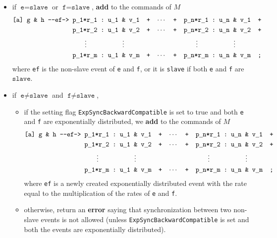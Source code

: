 \documentclass{article}
\newcommand{\arci}[1]{{-}{-}{#1}->}
\renewcommand{\_}{\underline{~}}
\newcommand{\code}[1]{\texttt{#1}}
\begin{document}
\begin{enumerate}
\begin{itemize}
		\item if $\code{e} = \code{slave}$ or  $\code{f} = \code{slave}$, \textbf{add} to the commands of $M$ 
		\begin{align*}
			\code{[a] g \&  h \arci{ef}} 
			  & \code{ p\_1*r\_1\ :\ u\_1 \& v\_1 ~+~ $\cdots$ ~+~ p\_n*r\_1\ :\ u\_n \& v\_1 ~+}\\
			  & \code{ p\_1*r\_2\ :\ u\_1 \& v\_2 ~+~ $\cdots$ ~+~ p\_n*r\_2\ :\ u\_n \& v\_2 ~+}\\
              & ~~~~~~~ \vdots ~~~~~~~~~~~~~~~~ \vdots ~~~~~~~~~~~~~~~~~~~~~~~~~~~~~~~~ \vdots ~~~~~~~~~~~~~~~~ \vdots \\
			  & \code{ p\_1*r\_m\ :\ u\_1 \& v\_m ~+~ $\cdots$ ~+~ p\_n*r\_m\ :\ u\_n \& v\_m ~;}\\
		\end{align*}
		where \code{ef} is the non-slave event of \code{e} and \code{f}, or it is \code{slave} if both \code{e} and \code{f} are $\code{slave}$.
		\item if $\code{e} \neq \code{slave}$ and $\code{f} \neq \code{slave}$, 
		\begin{itemize}
			\item if the setting flag \code{ExpSyncBackwardCompatible} is set to true and both \code{e} and \code{f} are exponentially distributed, we \textbf{add} to the commands of $M$ 
			\begin{align*}
			   \code{[a] g \&  h \arci{ef}} 
			     & \code{ p\_1*r\_1\ :\ u\_1 \& v\_1 ~+~ $\cdots$ ~+~ p\_n*r\_1\ :\ u\_n \& v\_1 ~+}\\
			     & \code{ p\_1*r\_2\ :\ u\_1 \& v\_2 ~+~ $\cdots$ ~+~ p\_n*r\_2\ :\ u\_n \& v\_2 ~+}\\
			     & ~~~~~~~ \vdots ~~~~~~~~~~~~~~~~ \vdots ~~~~~~~~~~~~~~~~~~~~~~~~~~~~~~~~ \vdots ~~~~~~~~~~~~~~~~ \vdots \\
			     & \code{ p\_1*r\_m\ :\ u\_1 \& v\_m ~+~ $\cdots$ ~+~ p\_n*r\_m\ :\ u\_n \& v\_m ~;}\\
			\end{align*}
			where \code{ef} is a newly created exponentially distributed event with the rate equal to the multiplication of the rates of \code{e} and \code{f}.
			
			
			\item otherwise, return an \textbf{error} saying that synchronization between two non-slave events is not allowed (unless \code{ExpSyncBackwardCompatible} is set and both the events are exponentially distributed).
		\end{itemize} 
	\end{itemize}
\end{enumerate}
\end{document}
